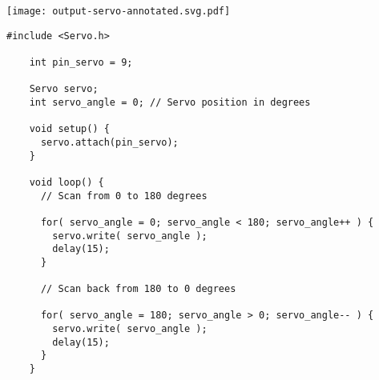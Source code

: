 \vspace{0.1in}
\begin{minipage}[t]{0.49\tw}
  \vspace{0.0in}
  \texttt{[image: output-servo-annotated.svg.pdf]}
\end{minipage}
\hspace{0.1in}
\begin{minipage}[t]{0.49\tw}
  \vspace{0.1in}
  \begin{Verbatim}[gobble=3,fontsize=\small]
    #include <Servo.h>

    int pin_servo = 9;

    Servo servo;
    int servo_angle = 0; // Servo position in degrees

    void setup() {
      servo.attach(pin_servo);
    }

    void loop() {
      // Scan from 0 to 180 degrees

      for( servo_angle = 0; servo_angle < 180; servo_angle++ ) {
        servo.write( servo_angle );
        delay(15);
      }

      // Scan back from 180 to 0 degrees

      for( servo_angle = 180; servo_angle > 0; servo_angle-- ) {
        servo.write( servo_angle );
        delay(15);
      }
    }
  \end{Verbatim}
\end{minipage}
\vspace{0.1in}


